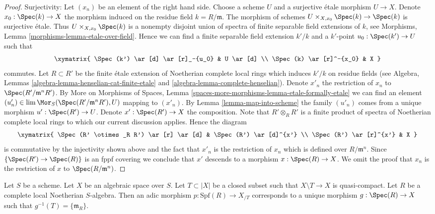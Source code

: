 \begin{proof}
\medskip\noindent
Surjectivity: Let $(x_n)$ be an element of the right hand side.
Choose a scheme $U$ and a surjective \'etale morphism $U \to X$. 
Denote $x_0 : \Spec(k) \to X$ the morphism induced on the residue field
$k = R/\mathfrak m$. The morphism of schemes
$U \times_{X, x_0} \Spec(k) \to \Spec(k)$ is surjective \'etale.
Thus $U \times_{X, x_0} \Spec(k)$ is a nonempty disjoint union of spectra
of finite separable field extensions of $k$, see
Morphisms, Lemma \ref{morphisms-lemma-etale-over-field}.
Hence we can find a finite separable field extension $k'/k$
and a $k'$-point $u_0 : \Spec(k') \to U$ such that
$$
\xymatrix{
\Spec(k') \ar[d] \ar[r]_-{u_0} & U \ar[d] \\
\Spec(k) \ar[r]^-{x_0} & X
}
$$
commutes. Let $R \subset R'$ be the finite \'etale extension of Noetherian
complete local rings which induces $k'/k$ on residue fields
(see Algebra, Lemmas \ref{algebra-lemma-henselian-cat-finite-etale} and
\ref{algebra-lemma-complete-henselian}). Denote $x'_n$ the restriction
of $x_n$ to $\Spec(R'/\mathfrak m^nR')$. By
More on Morphisms of Spaces, Lemma
\ref{spaces-more-morphisms-lemma-etale-formally-etale}
we can find an element
$(u'_n) \in \lim \Mor_S(\Spec(R'/\mathfrak m^nR'), U)$
mapping to $(x'_n)$. By Lemma \ref{lemma-map-into-scheme}
the family $(u'_n)$ comes from a unique
morphism $u' : \Spec(R') \to U$. Denote $x' : \Spec(R') \to X$ the
composition. Note that $R' \otimes_R R'$ is a finite product of spectra of
Noetherian complete local rings to which our current discussion applies.
Hence the diagram
$$
\xymatrix{
\Spec(R' \otimes_R R') \ar[r] \ar[d] & \Spec(R') \ar[d]^{x'} \\
\Spec(R') \ar[r]^{x'} & X
}
$$
is commutative by the injectivity shown above and the fact that
$x'_n$ is the restriction of $x_n$ which is defined over $R/\mathfrak m^n$.
Since $\{\Spec(R') \to \Spec(R)\}$ is an fppf covering we conclude
that $x'$ descends to a morphism $x : \Spec(R) \to X$.
We omit the proof that $x_n$ is the restriction of $x$ to
$\Spec(R/\mathfrak m^n)$.
\end{proof}

\begin{lemma}
\label{lemma-adic-into-completion}
Let $S$ be a scheme. Let $X$ be an algebraic space over $S$.
Let $T \subset |X|$ be a closed subset such that
$X \setminus T \to X$ is quasi-compact. Let $R$ be a complete local
Noetherian $S$-algebra. Then an adic morphism $p : \text{Spf}(R) \to X_{/T}$
corresponds to a unique morphism $g : \Spec(R) \to X$ such
that $g^{-1}(T) = \{\mathfrak m_R\}$. 
\end{lemma}

